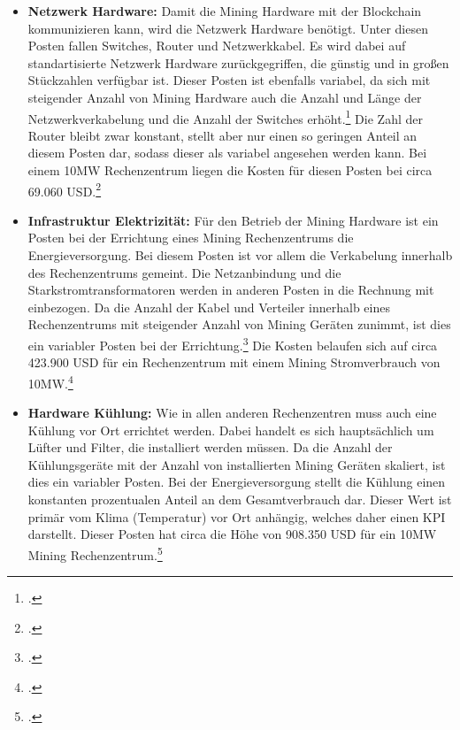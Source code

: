 \begin{itemize}
    Der Posten der Mining Hardware ist variabel, da sich dieser proportional zur Anzahl der Miner verhält. Bei einem
    10MW Rechenzentrum wären dies circa 2.987 S19 Pro Miner\footcite[Cf.][]{appendix:s19proassumptions} bei einem Gesamtpreis
    von circa 8.068.708 USD.\footcite[Cf.][]{appendix:capex}
    \item \textbf{Netzwerk Hardware: }Damit die Mining Hardware mit der Blockchain kommunizieren kann, wird die Netzwerk
    Hardware benötigt. Unter diesen Posten fallen Switches, Router und Netzwerkkabel. Es wird dabei auf standartisierte
    Netzwerk Hardware zurückgegriffen, die günstig und in großen Stückzahlen verfügbar ist. Dieser Posten ist ebenfalls
    variabel, da sich mit steigender Anzahl von Mining Hardware auch die Anzahl und Länge der Netzwerkverkabelung und die Anzahl
    der Switches erhöht.\footcite[Cf.][]{appendix:capex} Die Zahl der Router bleibt zwar konstant, stellt aber nur einen so
    geringen Anteil an diesem Posten dar, sodass dieser als variabel angesehen werden kann. Bei einem 10MW Rechenzentrum
    liegen die Kosten für diesen Posten bei circa 69.060 USD.\footcite[Cf.][]{appendix:capex}
    \item \textbf{Infrastruktur Elektrizität: }Für den Betrieb der Mining Hardware ist ein Posten bei der Errichtung
    eines Mining Rechenzentrums die Energieversorgung. Bei diesem Posten ist vor allem die Verkabelung innerhalb des
    Rechenzentrums gemeint. Die Netzanbindung und die Starkstromtransformatoren werden in anderen Posten in die Rechnung
    mit einbezogen. Da  die Anzahl der Kabel und Verteiler innerhalb eines Rechenzentrums mit steigender Anzahl von Mining
    Geräten zunimmt, ist dies ein variabler Posten bei der Errichtung.\footcite[Cf.][]{appendix:capex} Die Kosten belaufen
    sich auf circa 423.900 USD für ein Rechenzentrum mit einem Mining Stromverbrauch von 10MW.\footcite[Cf.][]{appendix:capex}
    \item \textbf{Hardware Kühlung: }Wie in allen anderen Rechenzentren muss auch eine Kühlung vor Ort errichtet werden.
    Dabei handelt es sich hauptsächlich um Lüfter und Filter, die installiert werden müssen.
    Da die Anzahl der Kühlungsgeräte mit der Anzahl von installierten Mining Geräten skaliert, ist dies ein variabler Posten.
    Bei der Energieversorgung stellt die Kühlung einen konstanten prozentualen Anteil an dem Gesamtverbrauch dar.
    Dieser Wert ist primär vom Klima (Temperatur) vor Ort anhängig, welches daher einen \ac{KPI} darstellt. Dieser Posten
    hat circa die Höhe von 908.350 USD für ein 10MW Mining Rechenzentrum.\footcite[Cf.][]{appendix:capex}

\end{itemize}
